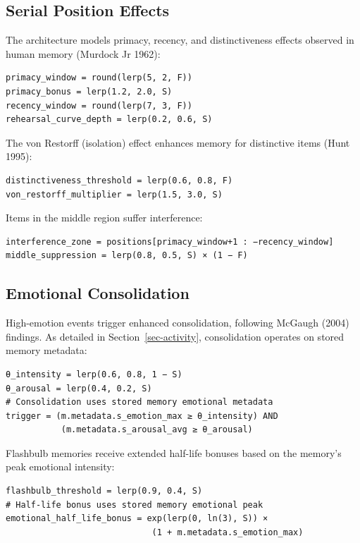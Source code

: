 \documentclass[
  letterpaper,
  DIV=11,
  numbers=noendperiod]{scrartcl}
\begin{document}
\subsection{Serial Position Effects}\label{serial-position-effects}

The architecture models primacy, recency, and distinctiveness effects
observed in human memory (Murdock Jr 1962):

\begin{verbatim}
primacy_window = round(lerp(5, 2, F))
primacy_bonus = lerp(1.2, 2.0, S)
recency_window = round(lerp(7, 3, F))
rehearsal_curve_depth = lerp(0.2, 0.6, S)
\end{verbatim}

The von Restorff (isolation) effect enhances memory for distinctive
items (Hunt 1995):

\begin{verbatim}
distinctiveness_threshold = lerp(0.6, 0.8, F)
von_restorff_multiplier = lerp(1.5, 3.0, S)
\end{verbatim}

Items in the middle region suffer interference:

\begin{verbatim}
interference_zone = positions[primacy_window+1 : −recency_window]
middle_suppression = lerp(0.8, 0.5, S) × (1 − F)
\end{verbatim}

\subsection{Emotional Consolidation}\label{sec-emotional-consolidation}

High-emotion events trigger enhanced consolidation, following McGaugh
(2004) findings. As detailed in Section~\ref{sec-activity},
consolidation operates on stored memory metadata:

\begin{verbatim}
θ_intensity = lerp(0.6, 0.8, 1 − S)
θ_arousal = lerp(0.4, 0.2, S)
# Consolidation uses stored memory emotional metadata
trigger = (m.metadata.s_emotion_max ≥ θ_intensity) AND
           (m.metadata.s_arousal_avg ≥ θ_arousal)
\end{verbatim}

Flashbulb memories receive extended half-life bonuses based on the
memory's peak emotional intensity:

\begin{verbatim}
flashbulb_threshold = lerp(0.9, 0.4, S)
# Half-life bonus uses stored memory emotional peak
emotional_half_life_bonus = exp(lerp(0, ln(3), S)) ×
                             (1 + m.metadata.s_emotion_max)
\end{verbatim}
\end{document}
